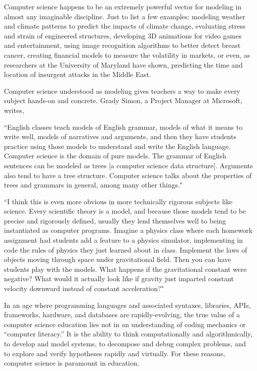 Computer science happens to be an extremely powerful vector for modeling in almost any imaginable discipline. Just to list a few examples: modeling weather and climate patterns to predict the impacts of climate change, evaluating stress and strain of engineered structures, developing 3D animations for video games and entertainment, using image recognition algorithms to better detect breast cancer, creating financial models to measure the volatility in markets, or even, as researchers at the University of Maryland have shown, predicting the time and location of insurgent attacks in the Middle East\cite{insurgent}. \par
Computer science understood as modeling gives teachers a way to make every subject hands-on and concrete. Grady Simon, a Project Manager at Microsoft, writes, 
\begin{blockquote}
	``English classes teach models of English grammar, models of what it means to write well, models of narratives and arguments, and then they have students practice using those models to understand and write the English language. Computer science is the domain of pure models. The grammar of English sentences can be modeled as trees [a computer science data structure]. Arguments also tend to have a tree structure. Computer science talks about the properties of trees and grammars in general, among many other things." \par
	``I think this is even more obvious in more technically rigorous subjects like science. Every scientific theory is a model, and because those models tend to be precise and rigorously defined, usually they lend themselves well to being instantiated as computer programs. Imagine a physics class where each homework assignment had students add a feature to a physics simulator, implementing in code the rules of physics they just learned about in class. Implement the laws of objects moving through space under gravitational field. Then you can have students play with the models. What happens if the gravitational constant were negative? What would it actually look like if gravity just imparted constant velocity downward instead of constant acceleration?" 
	\end{blockquote} 
In an age where programming languages and associated syntaxes, libraries, APIs, frameworks, hardware, and databases are rapidly-evolving, the true value of a computer science education lies not in an understanding of coding mechanics or ``computer literacy.'' It is the ability to think computationally and algorithmically, to develop and model systems, to decompose and debug complex problems, and to explore and verify hypotheses rapidly and virtually. For these reasons, computer science is paramount in education.\par

